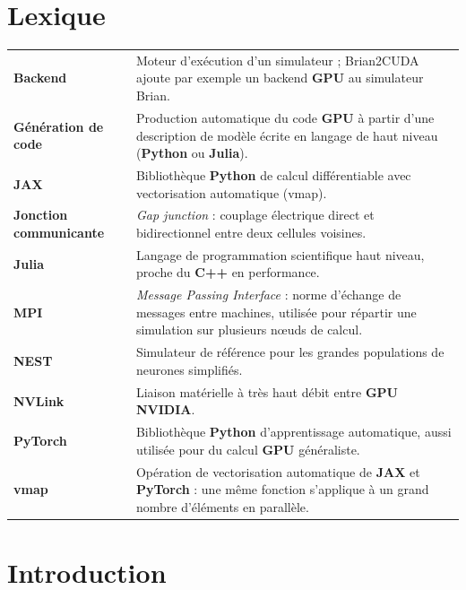 \documentclass{report}
\title{\DocName}
\author{\DocAuthors}
\date{\textbf{JUNIA - ISEN - AP4} \url{https://github.com/CharlesBta/Modele-Neuronaux-RD.git}}
\begin{document}
\maketitle

\chapter*{Lexique}

\begin{tabular}{@{}p{3.9cm}p{11cm}@{}}
    \textbf{Backend} & Moteur d'exécution d'un simulateur ; Brian2CUDA ajoute par exemple un backend \textbf{GPU} au simulateur Brian. \\[6pt]
    \textbf{Génération de code} & Production automatique du code \textbf{GPU} à partir d'une description de modèle écrite en langage de haut niveau (\textbf{Python} ou \textbf{Julia}). \\[6pt]
    \textbf{JAX} & Bibliothèque \textbf{Python} de calcul différentiable avec vectorisation automatique (vmap). \\[6pt]
    \textbf{Jonction communicante} & \emph{Gap junction} : couplage électrique direct et bidirectionnel entre deux cellules voisines. \\[6pt]
    \textbf{Julia} & Langage de programmation scientifique haut niveau, proche du \textbf{C++} en performance. \\[6pt]
    \textbf{MPI} & \emph{Message Passing Interface} : norme d'échange de messages entre machines, utilisée pour répartir une simulation sur plusieurs nœuds de calcul. \\[6pt]
    \textbf{NEST} & Simulateur de référence pour les grandes populations de neurones simplifiés. \\[6pt]
    \textbf{NVLink} & Liaison matérielle à très haut débit entre \textbf{GPU} \textbf{NVIDIA}. \\[6pt]
    \textbf{PyTorch} & Bibliothèque \textbf{Python} d'apprentissage automatique, aussi utilisée pour du calcul \textbf{GPU} généraliste. \\[6pt]
    \textbf{vmap} & Opération de vectorisation automatique de \textbf{JAX} et \textbf{PyTorch} : une même fonction s'applique à un grand nombre d'éléments en parallèle. \\
\end{tabular}

\tableofcontents

\chapter{Introduction}
\end{document}
